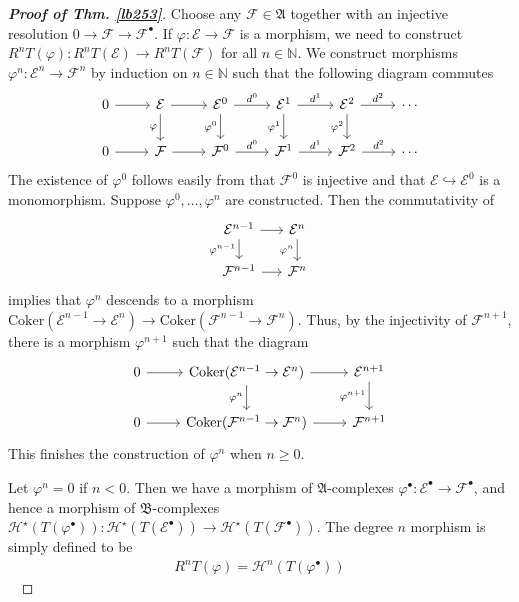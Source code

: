 \documentclass[12pt,b5paper,notitlepage]{report}
\theoremstyle{definition}
\theoremstyle{plain}
\newcommand{\fk}{\mathfrak}
\newcommand{\mc}{\mathcal}
\newcommand{\blt}{\bullet}
\newcommand{\Nbb}{\mathbb N}
\newcommand{\Cok}{\mathrm{Coker}}
\numberwithin{equation}{section}
\begin{document}
\begin{proof}[\textbf{Proof of Thm. \ref{lb253}}]
Choose any $\mc F\in\fk A$ together with an injective resolution $0\rightarrow\mc F\rightarrow\mc F^\blt$. If $\varphi:\mc E\rightarrow\mc F$ is a morphism, we need to construct $R^nT(\varphi):R^nT(\mc E)\rightarrow R^nT(\mc F)$ for all $n\in\Nbb$. We construct morphisms $\varphi^n:\mc E^n\rightarrow\mc F^n$ by induction on $n\in\Nbb$ such that the following diagram commutes
\begin{equation}\label{eq115}
\begin{tikzcd}
0 \arrow[r] & \mc E \arrow[r] \arrow[d, "\varphi"'] & \mc E^0 \arrow[r,"d^0"] \arrow[d, "\varphi^0"'] & \mc E^1 \arrow[r,"d^1"] \arrow[d, "\varphi^1"'] & \mc E^2 \arrow[r,"d^2"] \arrow[d, "\varphi^2"'] & \cdots \\
0 \arrow[r] & \mc F \arrow[r]                       & \mc F^0 \arrow[r,"d^0"]                         & \mc F^1 \arrow[r,"d^1"]                         & \mc F^2 \arrow[r,"d^2"]                         & \cdots
\end{tikzcd}
\end{equation}
The existence of $\varphi^0$ follows easily from that $\mc F^0$ is injective and that $\mc E\hookrightarrow\mc E^0$ is a monomorphism. Suppose $\varphi^0,\dots,\varphi^n$ are constructed. Then the commutativity of
\begin{equation*}
\begin{tikzcd}[sep=0.2in]
\mc E^{n-1} \arrow[r] \arrow[d,"\varphi^{n-1}"'] & \mc E^n \arrow[d,"\varphi^n"'] \\
\mc F^{n-1} \arrow[r]           & \mc F^n          
\end{tikzcd}
\end{equation*}
implies that $\varphi^n$ descends to a morphism $\Cok(\mc E^{n-1}\rightarrow\mc E^n)\rightarrow\Cok(\mc F^{n-1}\rightarrow\mc F^n)$. Thus, by the injectivity of $\mc F^{n+1}$, there is a morphism $\varphi^{n+1}$ such that the diagram
\begin{equation*}
\begin{tikzcd}
0 \arrow[r]&\Cok(\mc E^{n-1}\rightarrow\mc E^n) \arrow[r] \arrow[d,"\varphi^n"'] & \mc E^{n+1} \arrow[d,"\varphi^{n+1}"'] \\
0 \arrow[r]&\Cok(\mc F^{n-1}\rightarrow\mc F^n) \arrow[r]           & \mc F^{n+1}        
\end{tikzcd}
\end{equation*}
This finishes the construction of $\varphi^n$ when $n\geq 0$.

Let $\varphi^n=0$ if $n<0$. Then we have a morphism of $\fk A$-complexes $\varphi^\blt:\mc E^\blt\rightarrow\mc F^\blt$, and hence a morphism of $\fk B$-complexes $\mc H^\star(T(\varphi^\blt)):\mc H^\star(T(\mc E^\blt))\rightarrow\mc H^\star(T(\mc F^\blt))$. The degree $n$ morphism is simply defined to be
\begin{align}
R^nT(\varphi)=\mc H^n(T(\varphi^\blt))\label{eq116}
\end{align}
{~}


\end{proof}
\end{document}
